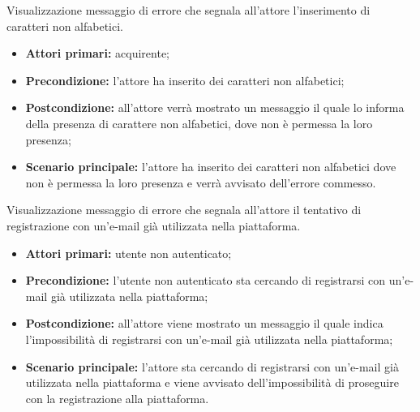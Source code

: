 \label{estensione:caratteri-non-alfabetici-non-permessi}

Visualizzazione messaggio di errore che segnala all'attore l'inserimento di caratteri non alfabetici.
\begin{itemize}
    \item \textbf{Attori primari:} acquirente;
    \item \textbf{Precondizione:} l'attore ha inserito dei caratteri non alfabetici;
    \item \textbf{Postcondizione:} all'attore verrà mostrato un messaggio il quale lo informa della presenza di carattere non alfabetici, dove non è permessa la loro presenza;
    \item \textbf{Scenario principale:} l'attore ha inserito dei caratteri non alfabetici dove non è permessa la loro presenza e verrà avvisato dell'errore commesso.
\end{itemize}

\label{estensione:registrazione-con-email-non-esistente}

Visualizzazione messaggio di errore che segnala all'attore il tentativo di registrazione con un'e-mail già utilizzata nella piattaforma.
\begin{itemize}
    \item \textbf{Attori primari:} utente non autenticato;
    \item \textbf{Precondizione:} l'utente non autenticato sta cercando di registrarsi con un'e-mail già utilizzata nella piattaforma;
    \item \textbf{Postcondizione:} all'attore viene mostrato un messaggio il quale indica l'impossibilità di registrarsi con un'e-mail già utilizzata nella piattaforma;
    \item \textbf{Scenario principale:} l'attore sta cercando di registrarsi con un'e-mail già utilizzata nella piattaforma e viene avvisato dell'impossibilità di proseguire con la registrazione alla piattaforma.
\end{itemize}

\label{estensione:cambio-con-email-esistente}

